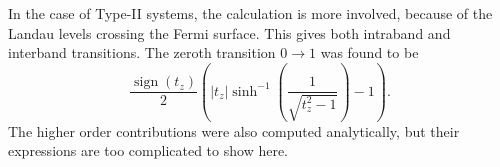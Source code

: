 \documentclass[%
 reprint,
 amsmath,amssymb,
 aps,
]{revtex4-2}
\DeclareMathOperator\sign{sign}
\begin{document}
In the case of Type-II systems, the calculation is more involved, because of the Landau levels crossing the Fermi surface.
This gives both intraband and interband transitions.
The zeroth transition \( 0 \to 1 \) was found to be
\begin{equation}
  \label{eq:7}
  \frac{\sign(t_z)}{2}
  \left( |t_z| \sinh^{-1} \left(\frac{1}{\sqrt{t_{z}^2 -1} }\right) -1 \right).
\end{equation}
The higher order contributions were also computed analytically, but their expressions are too complicated to show here.


\begin{figure}
\end{figure}
\end{document}

